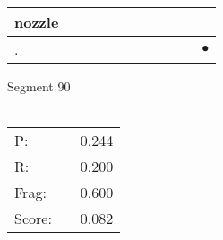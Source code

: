 \documentclass[landscape]{article}
\newcommand{\ssp}{\hspace{2pt}}
\newcommand{\mex}{\cellcolor{g}$\bullet$}
\begin{document}
\begin{tabular}{|l|p{10pt}|p{10pt}|p{10pt}|p{10pt}|p{10pt}|p{10pt}|p{10pt}|p{10pt}|p{10pt}|p{10pt}|}
\hline
\ssp nozzle \ssp&\hspace{2pt}&\hspace{2pt}&\hspace{2pt}&\hspace{2pt}&\hspace{2pt}&\hspace{2pt}&\hspace{2pt}&\hspace{2pt}&\hspace{2pt}&\hspace{2pt}\\
\hline
\ssp \cellcolor{ref9}. \ssp&\hspace{2pt}&\hspace{2pt}&\hspace{2pt}&\hspace{2pt}&\hspace{2pt}&\hspace{2pt}&\hspace{2pt}&\hspace{2pt}&\hspace{2pt}&\hspace{2pt}\mex\\
\hline
\end{tabular}

\vspace{6pt}
\noindent Segment 90\\\\
\noindent\begin{tabular}{lm{12pt}r}
\hline
P:&&0.244\\
R:&&0.200\\
Frag:&&0.600\\
Score:&&0.082\\
\end{tabular}

\newpage
\end{document}
